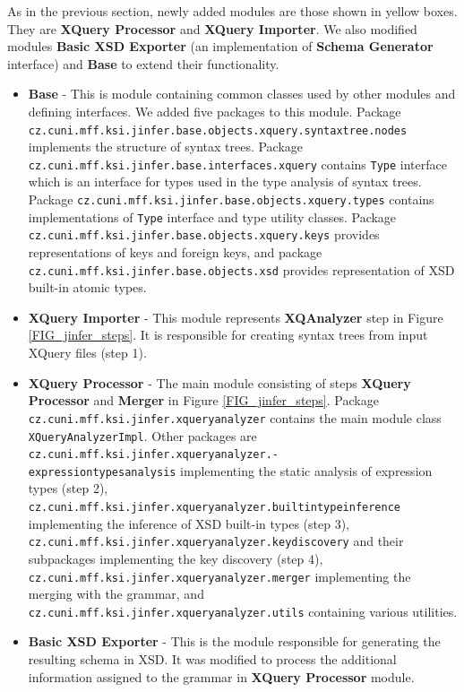 As in the previous section, newly added modules are those shown in yellow boxes. They are \textbf{XQuery Processor} and \textbf{XQuery Importer}. We also modified modules \textbf{Basic XSD Exporter} (an implementation of \textbf{Schema Generator} interface) and \textbf{Base} to extend their functionality.

\begin{itemize}
\item \textbf{Base} - This is module containing common classes used by other modules and defining interfaces. We added five packages to this module. Package \texttt{cz.cuni.mff.ksi.jinfer.base.objects.xquery.syntaxtree.nodes} implements the structure of syntax trees. Package \texttt{cz.cuni.mff.ksi.jinfer\-.base.interfaces.xquery} contains \texttt{Type} interface which is an interface for types used in the type analysis of syntax trees. Package \texttt{cz.cuni.mff.ksi\-.jinfer.base\-.objects.xquery.types} contains implementations of \texttt{Type} interface and type utility classes. Package \texttt{cz.cuni.mff.ksi.jinfer\-.base\-.objects.xquery.keys} provides representations of keys and foreign keys, and package \texttt{cz.cuni.mff.ksi\-.jinfer.base.objects.xsd} provides representation of XSD built-in atomic types.
\item \textbf{XQuery Importer} - This module represents \textbf{XQAnalyzer} step in Figure \ref{FIG_jinfer_steps}. It is responsible for creating syntax trees from input XQuery files (step 1).
\item \textbf{XQuery Processor} - The main module consisting of steps \textbf{XQuery Processor} and \textbf{Merger} in Figure \ref{FIG_jinfer_steps}. Package \texttt{cz.cuni.mff.ksi.jinfer\-.xqueryanalyzer} contains the main module class \texttt{XQueryAnalyzerImpl}. Other packages are \texttt{cz.cuni.mff.ksi.jinfer.xqueryanalyzer.-\\expressiontypesanalysis} implementing the static analysis of expression types (step 2), \texttt{cz.cuni.mff.ksi.jinfer.xqueryanalyzer.builtintype\-inference} implementing the inference of XSD built-in types (step 3), \texttt{cz\-.cuni.mff\-.ksi.jinfer\-.xqueryanalyzer.keydiscovery} and their subpackages implementing the key discovery (step 4), \texttt{cz.cuni.mff.ksi.jinfer\-.xqueryanalyzer.merger} implementing the merging with the grammar, and \texttt{cz.cuni.mff.ksi.jinfer.xqueryanalyzer.utils} containing various utilities.
\item \textbf{Basic XSD Exporter} - This is the module responsible for generating the resulting schema in XSD. It was modified to process the additional information assigned to the grammar in \textbf{XQuery Processor} module.
\end{itemize}